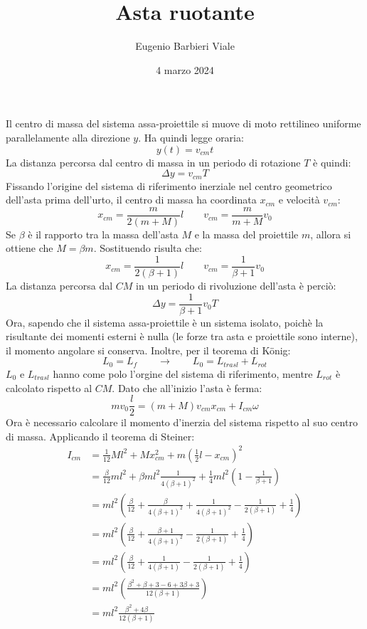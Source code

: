 \documentclass[]{article}
\title{Asta ruotante}
\author{Eugenio Barbieri Viale}
\date{4 marzo 2024}
\begin{document}
\maketitle

Il centro di massa del sistema assa-proiettile si muove di moto rettilineo uniforme parallelamente alla direzione $y$. Ha quindi legge oraria:
$$y(t)=v_{cm}t$$
La distanza percorsa dal centro di massa in un periodo di rotazione $T$ è quindi:
$$\Delta y=v_{cm}T$$
Fissando l'origine del sistema di riferimento inerziale nel centro geometrico dell'asta prima dell'urto, il centro di massa ha coordinata $x_{cm}$ e velocità $v_{cm}$:
$$x_{cm}=\frac{m}{2(m+M)}l \hspace{2em} v_{cm}=\frac{m}{m+M}v_0$$
Se $\beta$ è il rapporto tra la massa dell'asta $M$ e la massa del proiettile $m$, allora si ottiene che $M=\beta m$. Sostituendo risulta che:
$$x_{cm}=\frac{1}{2(\beta+1)}l \hspace{2em} v_{cm}=\frac{1}{\beta+1}v_0$$
La distanza percorsa dal $CM$ in un periodo di rivoluzione dell'asta è perciò:
$$\Delta y=\frac{1}{\beta+1}v_0 T$$
Ora, sapendo che il sistema assa-proiettile è un sistema isolato, poichè la risultante dei momenti esterni è nulla (le forze tra asta e proiettile sono interne), il momento angolare si conserva. Inoltre, per il teorema di König:
$$L_0=L_f \hspace{2em} \rightarrow \hspace{2em} L_0=L_{trasl}+L_{rot}$$
$L_0$ e $L_{trasl}$ hanno come polo l'orgine del sistema di riferimento, mentre $L_{rot}$ è calcolato rispetto al $CM$. Dato che all'inizio l'asta è ferma:
$$mv_0\frac{l}{2}=(m+M)v_{cm}x_{cm}+I_{cm}\omega$$
Ora è necessario calcolare il momento d'inerzia del sistema rispetto al suo centro di massa. Applicando il teorema di Steiner:
\begin{align}
	I_{cm} &= \frac{1}{12}Ml^2 + Mx_{cm}^2 + m(\frac{1}{2}l-x_{cm})^2 \\
		   &= \frac{\beta}{12}ml^2 + \beta ml^2\frac{1}{4(\beta+1)^2} + \frac{1}{4}ml^2(1-\frac{1}{\beta+1}) \\
		   &= ml^2\left(\frac{\beta}{12}+\frac{\beta}{4(\beta+1)^2}+\frac{1}{4(\beta+1)^2}-\frac{1}{2(\beta+1)}+\frac{1}{4}\right) \\
		   &= ml^2\left(\frac{\beta}{12}+\frac{\beta+1}{4(\beta+1)^2}-\frac{1}{2(\beta+1)}+\frac{1}{4}\right) \\
		   &= ml^2\left(\frac{\beta}{12}+\frac{1}{4(\beta+1)}-\frac{1}{2(\beta+1)}+\frac{1}{4}\right) \\
		   &= ml^2\left(\frac{\beta^2+\beta+3-6+3\beta+3}{12(\beta+1)}\right) \\
		   &= ml^2\frac{\beta^2+4\beta}{12(\beta+1)}
\end{align}
\end{document}
